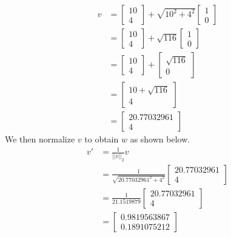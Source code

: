 \documentclass{article}
\begin{document}
\[
\begin{split}
    v &= \begin{bmatrix}
    10 \\
    4
\end{bmatrix}+\sqrt{10^2+4^2}\begin{bmatrix}
    1 \\
    0
\end{bmatrix} \\
&= \begin{bmatrix}
    10 \\
    4
\end{bmatrix}+\sqrt{116}\begin{bmatrix}
    1 \\
    0
\end{bmatrix} \\
&= \begin{bmatrix}
    10 \\
    4
\end{bmatrix}+\begin{bmatrix}
    \sqrt{116} \\
    0
\end{bmatrix} \\
&= \begin{bmatrix}
    10 + \sqrt{116} \\
    4
\end{bmatrix} \\
&= \begin{bmatrix}
    20.77032961 \\
    4
\end{bmatrix}
\end{split}
\]
We then normalize \(v\) to obtain \(w\) as shown below.
\[
\begin{split}
    v' &= \frac{1}{||v||_2}v \\
    &= \frac{1}{\sqrt{20.77032961^2+4^2}}\begin{bmatrix}
        20.77032961 \\
        4
    \end{bmatrix} \\
    &= \frac{1}{21.1519879}\begin{bmatrix}
        20.77032961 \\
        4
    \end{bmatrix} \\
    &= \begin{bmatrix}
        0.9819563867 \\
        0.1891075212
    \end{bmatrix} \\
\end{split}
\]
\end{document}
